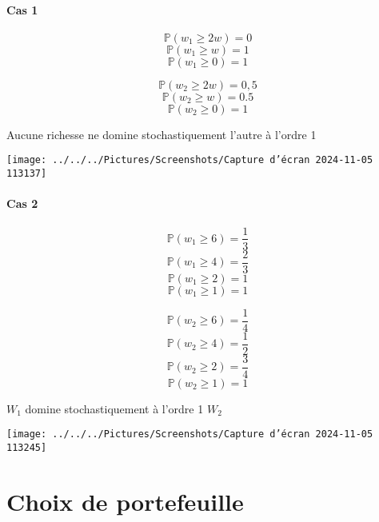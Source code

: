 \documentclass[a4paper, 12pt]{report}
\begin{document}
\subsubsection{Cas 1}
\[ \mathbb{P}(w_1  \geq  2w) =0 \]
\[ \mathbb{P}(w_1  \geq  w) = 1 \]
\[ \mathbb{P}(w_1  \geq  0) = 1 \]

\[ \mathbb{P}(w_2  \geq  2w) =0,5 \]
\[ \mathbb{P}(w_2  \geq  w) = 0.5 \]
\[ \mathbb{P}(w_2  \geq  0) = 1 \]

Aucune richesse ne domine stochastiquement l'autre à l'ordre 1

\begin{center}
	\texttt{[image: ../../../Pictures/Screenshots/Capture d'écran 2024-11-05 113137]}
\end{center}

\subsubsection{Cas 2}

\[ \mathbb{P}(w_1  \geq  6) = \frac{1}{3} \]
\[ \mathbb{P}(w_1  \geq  4) = \frac{2}{3} \]
\[ \mathbb{P}(w_1  \geq  2) = 1 \]
\[ \mathbb{P}(w_1  \geq  1) = 1 \]

\[ \mathbb{P}(w_2  \geq  6) = \frac{1}{4} \]
\[ \mathbb{P}(w_2  \geq  4) = \frac{1}{2} \]
\[ \mathbb{P}(w_2  \geq  2) = \frac{3}{4} \]
\[ \mathbb{P}(w_2  \geq  1) = 1 \]

\(W_1\) domine stochastiquement à l'ordre 1 \(W_2\)

\begin{center}
	\texttt{[image: ../../../Pictures/Screenshots/Capture d'écran 2024-11-05 113245]}
\end{center}

\chapter{Choix de portefeuille}
\end{document}
